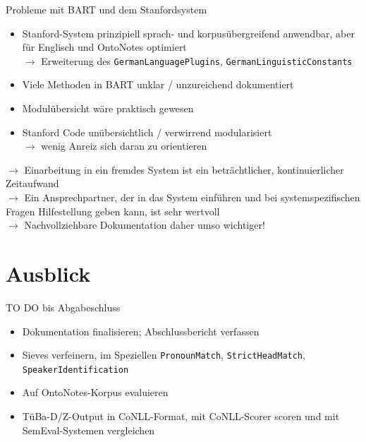 \documentclass[11pt,a4paper]{beamer}
\begin{document}
\begin{frame}{Probleme mit BART und dem Stanfordsystem}
\begin{itemize}
\item Stanford-System prinzipiell sprach- und korpusübergreifend anwendbar, aber für Englisch und OntoNotes optimiert\\
$\rightarrow$ Erweiterung des \texttt{GermanLanguagePlugins}, \texttt{GermanLinguisticConstants}
\item Viele Methoden in BART unklar / unzureichend dokumentiert
\item Modulübersicht wäre praktisch gewesen
\item Stanford Code unübersichtlich / verwirrend modularisiert\\$\rightarrow$ wenig Anreiz sich daran zu orientieren
\end{itemize}
$\rightarrow$ Einarbeitung in ein fremdes System ist ein beträchtlicher, kontinuierlicher Zeitaufwand\\
$\rightarrow$ Ein Ansprechpartner, der in das System einführen und bei systemspezifischen Fragen Hilfestellung geben kann, ist sehr wertvoll\\
$\rightarrow$ Nachvollziehbare Dokumentation daher umso wichtiger!
\end{frame}

\section{Ausblick}
\begin{frame}{TO DO bis Abgabeschluss}
\begin{itemize}
\item Dokumentation finalisieren; Abschlussbericht verfassen
\item Sieves verfeinern, im Speziellen \texttt{PronounMatch}, \texttt{StrictHeadMatch}, \texttt{SpeakerIdentification}
\item Auf OntoNotes-Korpus evaluieren
\item TüBa-D/Z-Output in CoNLL-Format, mit CoNLL-Scorer scoren und mit SemEval-Systemen vergleichen
\end{itemize}
\end{frame}
\end{document}
